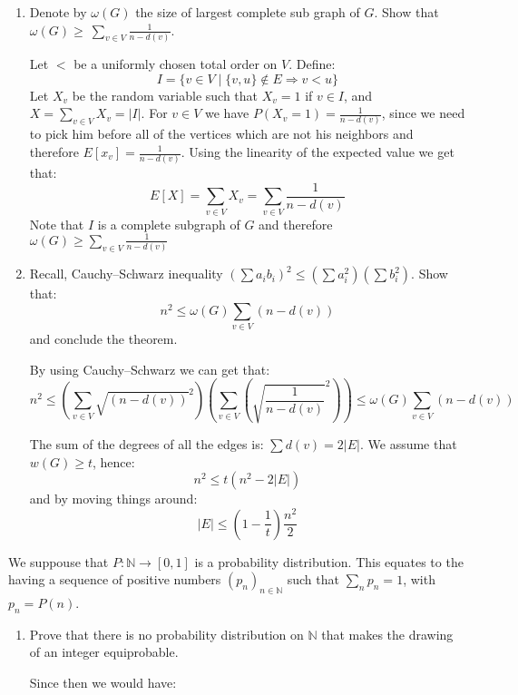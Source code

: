 \documentclass[a4paper,11pt]{exam}
\newcommand{\N}{\mathbb{N}}
\begin{document}
\begin{questions}
\begin{enumerate}
	\item Denote by $\omega(G)$ the size of largest complete sub graph of $G$. Show that $\omega(G)\geq~\sum_{v\in V}\frac{1}{n-d(v)}$.
	\begin{solution}
		Let $<$ be a uniformly chosen total order on $V$. Define:
		\[
		I=\{v\in V\mid \{v,u\}\notin E \Rightarrow v<u \}
		\]
		Let $X_v$ be the random variable such that $X_v=1$ if $ v\in I $, and $X = \sum_{v\in V} X_v = |I|$.
		For $v\in V$ we have $P(X_v=1)=\frac{1}{n-d(v)}$, since we need to pick him before all of the vertices which are not his neighbors and therefore $E[x_v]=\frac{1}{n-d(v)}$. 
		Using the linearity of the expected value we get that:
		\[
		E[X]=\sum_{v\in V} X_v=\sum_{v\in V}\frac{1}{n-d(v)}
		\]
		Note that $I$ is a complete subgraph of $G$ and therefore $\omega(G)\geq\sum_{v\in V}\frac{1}{n-d(v)}$
	\end{solution}
	
	
	
	\item Recall, Cauchy–Schwarz inequality $(\sum a_ib_i)^2\leq(\sum a_i^2)(\sum b_i^2)$. 
	Show that:
	$$n^2 \leq \omega(G)\sum_{v\in V} (n-d(v)) $$ 
	and conclude the theorem.
	\begin{solution}
		By using Cauchy–Schwarz we can get that:
		$$n^2 \leq \left(\sum_{v\in V} \sqrt{(n-d(v))}^2\right)\left(\sum_{v\in V} \left(\sqrt{\frac{1}{n-d(v)}}^2\right)\right)\leq \omega(G)\sum_{v\in V} (n-d(v)) $$
		
		The sum of the degrees of all the edges is: $\sum d(v) = 2|E|$. We assume that $w(G)\geq t$, hence:
		$$n^2 \leq t (n^2-2|E|)$$
		and by moving things around:		
		$$|E|\leq\left( 1- \frac{1}{t}\right)\frac{n^2}{2}$$
		
	\end{solution}
	
\end{enumerate}



\question

We suppouse that $P : \N \rightarrow [0,1]$ is a probability distribution.
This equates to the having a sequence of positive numbers $(p_n)_{n\in \N} $
such that $\sum_n p_n=1$, with  $p_n=P(n)$.


\begin{enumerate}
	\item Prove that there is no probability distribution on $ \N $ that makes the drawing of an integer equiprobable.
	
	\begin{solution}
		Since then we would have:
		

\end{solution}
\end{enumerate}
\end{questions}
\end{document}

